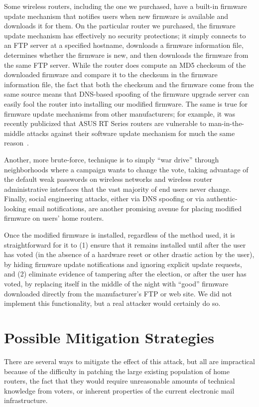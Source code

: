 \documentclass{article}
\begin{document}
Some wireless routers, including the one we purchased, have a built-in
firmware update mechanism that notifies users when new firmware is
available and downloads it for them. On the particular router we
purchased, the firmware update mechanism has effectively no security
protections; it simply connects to an FTP server at a specified
hostname, downloads a firmware information file, determines whether
the firmware is new, and then downloads the firmware from the same FTP
server. While the router does compute an MD5 checksum of the
downloaded firmware and compare it to the checksum in the firmware
information file, the fact that both the checksum and the firmware
come from the same source means that DNS-based spoofing of the
firmware upgrade server can easily fool the router into installing our
modified firmware. The same is true for firmware update mechanisms
from other manufacturers; for example, it was recently publicized that
ASUS RT Series routers are vulnerable to man-in-the-middle attacks
against their software update mechanism for much the same
reason~\cite{AsusMITM}.

Another, more brute-force, technique is to simply ``war drive''
through neighborhoods where a campaign wants to change the vote,
taking advantage of the default weak passwords on wireless networks
and wireless router administrative interfaces that the vast majority
of end users never change. Finally, social engineering attacks, either
via DNS spoofing or via authentic-looking email notifications, are
another promising avenue for placing modified firmware on users' home
routers.

Once the modified firmware is installed, regardless of the method
used, it is straightforward for it to (1) ensure that it remains
installed until after the user has voted (in the absence of a hardware
reset or other drastic action by the user), by hiding firmware update
notifications and ignoring explicit update requests, and (2) eliminate
evidence of tampering after the election, or after the user has voted,
by replacing itself in the middle of the night with ``good'' firmware
downloaded directly from the manufacturer's FTP or web site. We did
not implement this functionality, but a real attacker would certainly
do so.

\section{Possible Mitigation Strategies}

There are several ways to mitigate the effect of this attack, but all
are impractical because of the difficulty in patching the large
existing population of home routers, the fact that they would require
unreasonable amounts of technical knowledge from voters, or inherent
properties of the current electronic mail infrastructure.
\end{document}

